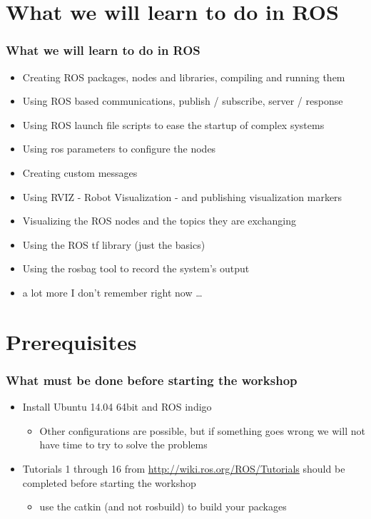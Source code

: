 \documentclass[]{beamer}
\begin{document}
\section{What we will learn to do in ROS} 
\begin{frame}\frametitle{What we will learn to do in ROS} 
\begin{itemize}
\item Creating ROS packages, nodes and libraries, compiling and running them
\item Using ROS based communications, publish / subscribe, server / response
\item Using ROS launch file scripts to ease the startup of complex systems
\item Using ros parameters to configure the nodes
\item Creating custom messages
\item Using RVIZ - Robot Visualization - and publishing visualization markers
\item Visualizing the ROS nodes and the topics they are exchanging
\item Using the ROS tf library (just the basics)
\item Using the rosbag tool to record the system's output
\item a lot more I don't remember right now \ldots
\end{itemize}
\end{frame}

\section{Prerequisites} 
\begin{frame}\frametitle{What must be done before starting the workshop}
\begin{itemize}
\item Install Ubuntu 14.04 64bit and ROS indigo 
\begin{itemize}
\item Other configurations are possible, but if something goes wrong we will not
have time to try to solve the problems
\end{itemize}
\item Tutorials 1 through 16 from \url{http://wiki.ros.org/ROS/Tutorials} should
be completed before starting the workshop
\begin{itemize}
\item use the catkin (and not rosbuild) to build your packages
\end{itemize}
\end{itemize}
\end{frame}
\end{document}
